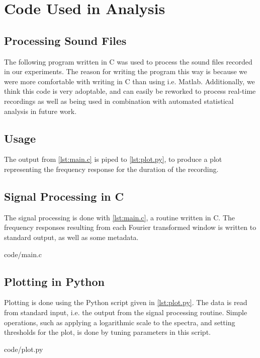 \chapter{Code Used in Analysis}\label{apx:code}

\section{Processing Sound Files}
The following program written in C was used to process the sound files recorded in our experiments. 
The reason for writing the program this way is because we were more comfortable with writing in C than using i.e. Matlab.
Additionally, we think this code is very adoptable, and can easily be reworked to process real-time recordings as well as being used in combination with automated statistical analysis in future work.

\section{Usage}
The output from \autoref{lst:main.c} is piped to \autoref{lst:plot.py}, to produce a plot representing the frequency response for the duration of the recording. 


\section{Signal Processing in C}
The signal processing is done with \autoref{lst:main.c}, a routine written in C.
The frequency responses resulting from each Fourier transformed window is written to standard output, as well as some metadata.

\begin{lstinputlisting}[language=C, caption={main.c - Compute Power Spectrum of a Sound File}, label={lst:main.c}]{code/main.c}
\end{lstinputlisting}


\section{Plotting in Python}
Plotting is done using the Python script given in \autoref{lst:plot.py}.
The data is read from standard input, i.e. the output from the signal processing routine.
Simple operations, such as applying a logarithmic scale to the spectra, and setting thresholds for the plot, is done by tuning parameters in this script.

\begin{lstinputlisting}[language=Python, caption={plot.py - Plot frequency spectra on time axis}, label={lst:plot.py}]{code/plot.py}
\end{lstinputlisting}
